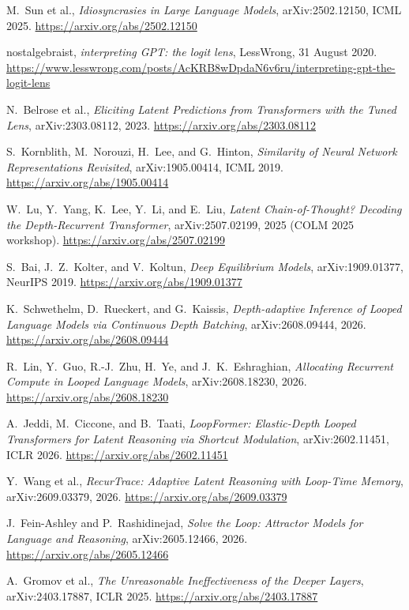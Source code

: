 \documentclass[11pt,letterpaper]{article}
\begin{document}
\begin{enumerate}[label={\textcolor{deepindigo}{[\arabic*]}}, leftmargin=2.6em, itemsep=0.3em]
  \item M.~Sun et al., \emph{Idiosyncrasies in Large Language Models}, arXiv:2502.12150, ICML 2025. \url{https://arxiv.org/abs/2502.12150}
  \item nostalgebraist, \emph{interpreting GPT: the logit lens}, LessWrong, 31 August 2020. \url{https://www.lesswrong.com/posts/AcKRB8wDpdaN6v6ru/interpreting-gpt-the-logit-lens}
  \item N.~Belrose et al., \emph{Eliciting Latent Predictions from Transformers with the Tuned Lens}, arXiv:2303.08112, 2023. \url{https://arxiv.org/abs/2303.08112}
  \item S.~Kornblith, M.~Norouzi, H.~Lee, and G.~Hinton, \emph{Similarity of Neural Network Representations Revisited}, arXiv:1905.00414, ICML 2019. \url{https://arxiv.org/abs/1905.00414}
  \item W.~Lu, Y.~Yang, K.~Lee, Y.~Li, and E.~Liu, \emph{Latent Chain-of-Thought? Decoding the Depth-Recurrent Transformer}, arXiv:2507.02199, 2025 (COLM 2025 workshop). \url{https://arxiv.org/abs/2507.02199}
  \item S.~Bai, J.~Z.~Kolter, and V.~Koltun, \emph{Deep Equilibrium Models}, arXiv:1909.01377, NeurIPS 2019. \url{https://arxiv.org/abs/1909.01377}
  \item K.~Schwethelm, D.~Rueckert, and G.~Kaissis, \emph{Depth-adaptive Inference of Looped Language Models via Continuous Depth Batching}, arXiv:2608.09444, 2026. \url{https://arxiv.org/abs/2608.09444}
  \item R.~Lin, Y.~Guo, R.-J.~Zhu, H.~Ye, and J.~K.~Eshraghian, \emph{Allocating Recurrent Compute in Looped Language Models}, arXiv:2608.18230, 2026. \url{https://arxiv.org/abs/2608.18230}
  \item A.~Jeddi, M.~Ciccone, and B.~Taati, \emph{LoopFormer: Elastic-Depth Looped Transformers for Latent Reasoning via Shortcut Modulation}, arXiv:2602.11451, ICLR 2026. \url{https://arxiv.org/abs/2602.11451}
  \item Y.~Wang et al., \emph{RecurTrace: Adaptive Latent Reasoning with Loop-Time Memory}, arXiv:2609.03379, 2026. \url{https://arxiv.org/abs/2609.03379}
  \item J.~Fein-Ashley and P.~Rashidinejad, \emph{Solve the Loop: Attractor Models for Language and Reasoning}, arXiv:2605.12466, 2026. \url{https://arxiv.org/abs/2605.12466}
  \item A.~Gromov et al., \emph{The Unreasonable Ineffectiveness of the Deeper Layers}, arXiv:2403.17887, ICLR 2025. \url{https://arxiv.org/abs/2403.17887}

\end{enumerate}
\end{document}
